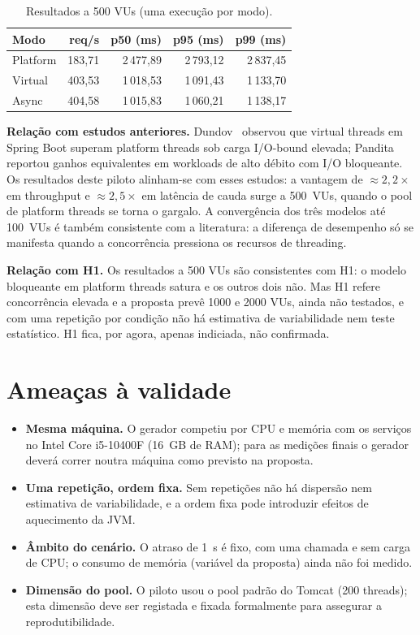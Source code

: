 \documentclass[sigplan]{acmart}
\begin{document}
\begin{table}[t]
\caption{Resultados a 500 VUs (uma execução por modo).}
\label{tab:500}
\centering\small
\begin{tabular}{lrrrr}
\toprule
Modo & req/s & p50 (ms) & p95 (ms) & p99 (ms)\\
\midrule
Platform & 183,71 & 2\,477,89 & 2\,793,12 & 2\,837,45\\
Virtual & 403,53 & 1\,018,53 & 1\,091,43 & 1\,133,70\\
Async & 404,58 & 1\,015,83 & 1\,060,21 & 1\,138,17\\
\bottomrule
\end{tabular}
\end{table}

\smallskip\noindent\textbf{Relação com estudos anteriores.} Dundov~\cite{dundov2026} observou que virtual threads em Spring Boot superam platform threads sob carga I/O-bound elevada; Pandita~\cite{pandita2024} reportou ganhos equivalentes em workloads de alto débito com I/O bloqueante. Os resultados deste piloto alinham-se com esses estudos: a vantagem de ${\approx}2{,}2\times$ em throughput e ${\approx}2{,}5\times$ em latência de cauda surge a 500~VUs, quando o pool de platform threads se torna o gargalo. A convergência dos três modelos até 100~VUs é também consistente com a literatura: a diferença de desempenho só se manifesta quando a concorrência pressiona os recursos de threading.

\smallskip\noindent\textbf{Relação com H1.} Os resultados a 500 VUs são consistentes com H1: o modelo bloqueante em platform threads satura e os outros dois não. Mas H1 refere concorrência elevada e a proposta prevê 1000 e 2000 VUs, ainda não testados, e com uma repetição por condição não há estimativa de variabilidade nem teste estatístico. H1 fica, por agora, apenas indiciada, não confirmada.

\section{Ameaças à validade}
\begin{itemize}
\item \textbf{Mesma máquina.} O gerador competiu por CPU e memória com os serviços no Intel Core i5-10400F (16~GB de RAM); para as medições finais o gerador deverá correr noutra máquina como previsto na proposta.
\item \textbf{Uma repetição, ordem fixa.} Sem repetições não há dispersão nem estimativa de variabilidade, e a ordem fixa pode introduzir efeitos de aquecimento da JVM.
\item \textbf{Âmbito do cenário.} O atraso de 1~s é fixo, com uma chamada e sem carga de CPU; o consumo de memória (variável da proposta) ainda não foi medido.
\item \textbf{Dimensão do pool.} O piloto usou o pool padrão do Tomcat (200 threads); esta dimensão deve ser registada e fixada formalmente para assegurar a reprodutibilidade.
\end{itemize}
\end{document}
